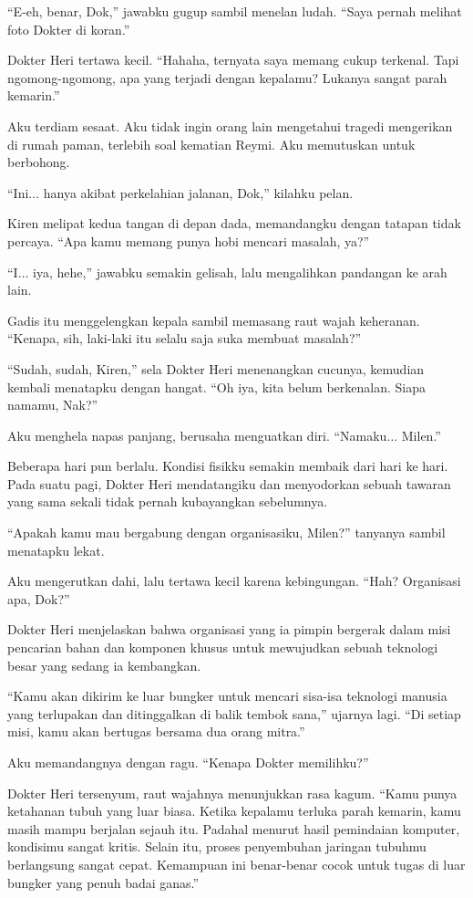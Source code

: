 ``E-eh, benar, Dok,'' jawabku gugup sambil menelan ludah. ``Saya pernah melihat foto Dokter di koran.''

Dokter Heri tertawa kecil. ``Hahaha, ternyata saya memang cukup terkenal. Tapi ngomong-ngomong, apa yang terjadi dengan kepalamu? Lukanya sangat parah kemarin.''

Aku terdiam sesaat. Aku tidak ingin orang lain mengetahui tragedi mengerikan di rumah paman, terlebih soal kematian Reymi. Aku memutuskan untuk berbohong.

``Ini$\dots$ hanya akibat perkelahian jalanan, Dok,'' kilahku pelan.

Kiren melipat kedua tangan di depan dada, memandangku dengan tatapan tidak percaya. ``Apa kamu memang punya hobi mencari masalah, ya?''

``I$\dots$ iya, hehe,'' jawabku semakin gelisah, lalu mengalihkan pandangan ke arah lain.

Gadis itu menggelengkan kepala sambil memasang raut wajah keheranan. ``Kenapa, sih, laki-laki itu selalu saja suka membuat masalah?''

``Sudah, sudah, Kiren,'' sela Dokter Heri menenangkan cucunya, kemudian kembali menatapku dengan hangat. ``Oh iya, kita belum berkenalan. Siapa namamu, Nak?''

Aku menghela napas panjang, berusaha menguatkan diri. ``Namaku$\dots$ Milen.''

Beberapa hari pun berlalu. Kondisi fisikku semakin membaik dari hari ke hari. Pada suatu pagi, Dokter Heri mendatangiku dan menyodorkan sebuah tawaran yang sama sekali tidak pernah kubayangkan sebelumnya.

``Apakah kamu mau bergabung dengan organisasiku, Milen?'' tanyanya sambil menatapku lekat.

Aku mengerutkan dahi, lalu tertawa kecil karena kebingungan. ``Hah? Organisasi apa, Dok?''

Dokter Heri menjelaskan bahwa organisasi yang ia pimpin bergerak dalam misi pencarian bahan dan komponen khusus untuk mewujudkan sebuah teknologi besar yang sedang ia kembangkan.

``Kamu akan dikirim ke luar bungker untuk mencari sisa-isa teknologi manusia yang terlupakan dan ditinggalkan di balik tembok sana,'' ujarnya lagi. ``Di setiap misi, kamu akan bertugas bersama dua orang mitra.''

Aku memandangnya dengan ragu. ``Kenapa Dokter memilihku?''

Dokter Heri tersenyum, raut wajahnya menunjukkan rasa kagum. ``Kamu punya ketahanan tubuh yang luar biasa. Ketika kepalamu terluka parah kemarin, kamu masih mampu berjalan sejauh itu. Padahal menurut hasil pemindaian komputer, kondisimu sangat kritis. Selain itu, proses penyembuhan jaringan tubuhmu berlangsung sangat cepat. Kemampuan ini benar-benar cocok untuk tugas di luar bungker yang penuh badai ganas.''

